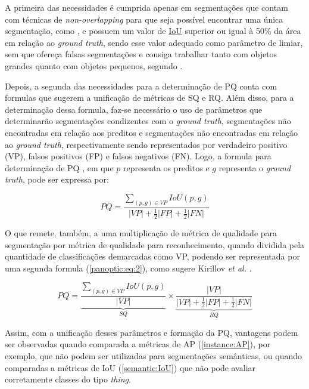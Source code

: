 A primeira das necessidades é cumprida apenas em segmentações que contam com técnicas de \textit{non-overlapping} para que seja possível encontrar uma única segmentação, como \cite{Neubeck2006}, e possuem um valor de \hyperref[semantic:IoU]{IoU} superior ou igual à 50\% da área em relação ao \textit{ground truth}, sendo esse valor adequado como parâmetro de limiar, sem que ofereça falsas segmentações e consiga trabalhar tanto com objetos grandes quanto com objetos pequenos, segundo \cite{Kirillov2019a}.

Depois, a segunda das necessidades para a determinação de PQ conta com formulas que sugerem a unificação de métricas de SQ e RQ. Além disso, para a determinação dessa formula, faz-se necessário o uso de parâmetros que determinarão segmentações condizentes com o \textit{ground truth}, segmentações não encontradas em relação aos preditos e segmentações não encontradas em relação ao \textit{ground truth}, respectivamente sendo representados por verdadeiro positivo (VP), falsos positivos (FP) e falsos negativos (FN). Logo, a formula para determinação de PQ \cite{Kirillov2019a}, em que $p$ representa os preditos e $g$ representa o \textit{ground truth}, pode ser expressa por:

\begin{equation}
\label{panoptic:eq:1}
    PQ = \frac{\sum _{(p,g) \in VP} IoU(p,g)}{|VP|+ \frac{1}{2}|FP| + \frac{1}{2}|FN|}
\end{equation}

O que remete, também, a uma multiplicação de métrica de qualidade para segmentação por métrica de qualidade para reconhecimento, quando dividida pela quantidade de classificações demarcadas como VP, podendo ser representada por uma segunda formula (\ref{panoptic:eq:2}), como sugere Kirillov \textit{et al.} \cite{Kirillov2019a}.

\begin{equation}
\label{panoptic:eq:2}
   PQ = \underbrace{\frac{\sum _{(p,g) \in VP} IoU(p,g)}{|VP|}}_{SQ} \times \underbrace{\frac{|VP|}{|VP|+ \frac{1}{2}|FP| + \frac{1}{2}|FN|}}_{RQ}
\end{equation}

Assim, com a unificação desses parâmetros e formação da PQ, vantagens podem ser observadas quando comparada a métricas de AP (\ref{instance:AP}), por exemplo, que não podem ser utilizadas para segmentações semânticas, ou quando comparadas a métricas de IoU (\ref{semantic:IoU}) que não pode avaliar corretamente classes do tipo \textit{thing}.

